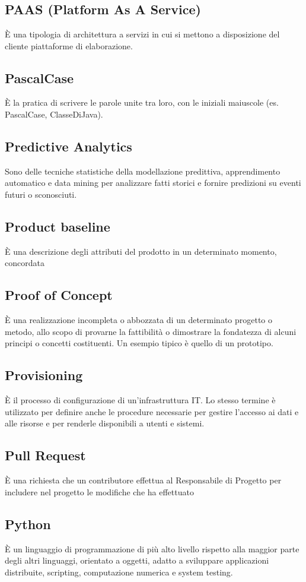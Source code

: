 \section{}
\subsection*{PAAS (Platform As A Service)} È una tipologia di architettura a servizi in cui si mettono a disposizione del cliente piattaforme di elaborazione.

\subsection*{PascalCase} È la pratica di scrivere le parole unite tra loro, con le iniziali maiuscole (es. PascalCase, ClasseDiJava).

\subsection*{Predictive Analytics} Sono delle tecniche statistiche della modellazione predittiva, apprendimento automatico e data mining per analizzare fatti storici e fornire predizioni su eventi futuri o sconosciuti.

\subsection*{Product baseline} È una descrizione degli attributi del prodotto in un determinato momento, concordata

\subsection*{Proof of Concept} È una realizzazione incompleta o abbozzata di un determinato progetto o metodo, allo scopo di provarne la fattibilità o dimostrare la fondatezza di alcuni principi o concetti costituenti. Un esempio tipico è quello di un prototipo.

\subsection*{Provisioning} È il processo di configurazione di un'infrastruttura IT.
Lo stesso termine è utilizzato per definire anche le procedure necessarie per gestire l'accesso ai dati e alle risorse e per renderle disponibili a utenti e sistemi.

\subsection*{Pull Request} È una richiesta che un contributore effettua al Responsabile di Progetto per includere nel progetto le modifiche che ha effettuato

\subsection*{Python} È un linguaggio di programmazione di più alto livello rispetto alla maggior parte degli altri linguaggi, orientato a oggetti, adatto a sviluppare applicazioni distribuite, scripting, computazione numerica e system testing.
